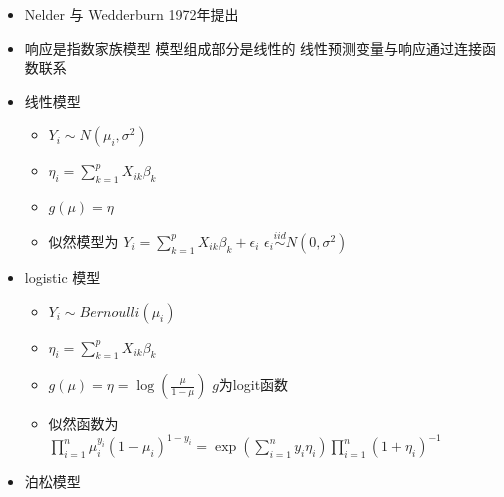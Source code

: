 \documentclass[]{book}
\providecommand{\tightlist}{%
  \setlength{\itemsep}{0pt}\setlength{\parskip}{0pt}}
\begin{document}
\begin{itemize}
\tightlist
\item
  Nelder 与 Wedderburn 1972年提出
\item
  响应是指数家族模型 模型组成部分是线性的 线性预测变量与响应通过连接函数联系
\item
  线性模型

  \begin{itemize}
  \tightlist
  \item
    \(Y_i \sim N(\mu_i, \sigma^2)\)
  \item
    \(\eta_i = \sum_{k=1}^p X_{ik} \beta_k\)
  \item
    \(g(\mu) = \eta\)
  \item
    似然模型为 \(Y_i = \sum_{k=1}^p X_{ik} \beta_k + \epsilon_{i}\) \(\epsilon_i \stackrel{iid}{\sim} N(0, \sigma^2)\)
  \end{itemize}
\item
  logistic 模型

  \begin{itemize}
  \tightlist
  \item
    \(Y_i \sim Bernoulli(\mu_i)\)
  \item
    \(\eta_i = \sum_{k=1}^p X_{ik} \beta_k\)
  \item
    \(g(\mu) = \eta = \log\left( \frac{\mu}{1 - \mu}\right)\) \(g\)为logit函数
  \item
    似然函数为 \(\prod_{i=1}^n \mu_i^{y_i} (1 - \mu_i)^{1-y_i} = \exp\left(\sum_{i=1}^n y_i \eta_i \right) \prod_{i=1}^n (1 + \eta_i)^{-1}\)
  \end{itemize}
\item
  泊松模型


\end{itemize}
\end{document}
